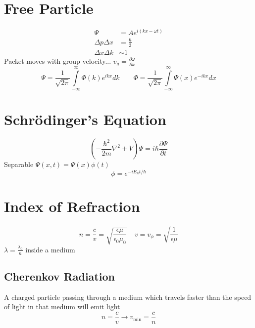 \documentclass[10pt,a4paper]{article}
\begin{document}
\section{Free Particle} %
\label{sec:free_particle}
\begin{align}
    \Psi &= Ae^{i(kx-\omega t)}\\
    \Delta p \Delta x &= \frac{\hbar}{2}\\
    \Delta  x \Delta k &\sim 1
\end{align}
Packet moves with group velocity... $v_g = \frac{\partial \omega}{\partial k}$
\begin{equation}
    \Psi = \frac{1}{\sqrt{2\pi}} \int \limits_{-\infty}^\infty \Phi(k)e^{ikx}dk~~~~~~~~~\Phi = \frac{1}{\sqrt{2\pi}} \int \limits_{-\infty}^{\infty} \Psi(x)e^{-ikx}dx
\end{equation}

\section{Schr\"odinger's Equation} %
\label{sec:schrodinger}
\begin{equation}
    \left( -\frac{\hbar^2}{2m}\nabla^2 + V \right) \Psi = i \hbar \frac{\partial \Psi}{\partial t}
\end{equation}
Separable $\Psi (x,t) = \Psi(x) \phi(t)$
\begin{equation}
    \phi = e^{-iE_nt/\hbar}
\end{equation}

\section{Index of Refraction} %
\label{sec:index_of_refraction}
\begin{equation}
    n = \frac{c}{v} = \sqrt{\frac{\epsilon \mu}{\epsilon_0 \mu_0}}~~~~~ v=v_\phi=\sqrt{\frac{1}{\epsilon \mu}}
\end{equation}
$\lambda = \frac{\lambda_0}{n}$ inside a medium

\subsection{Cherenkov Radiation} %
\label{sub:cherenkov_radiation}
A charged particle passing through a medium which travels faster than the speed of light in that medium will emit light
\begin{equation}
    n = \frac{c}{v} \longrightarrow v_{\textrm{min}} = \frac{c}{n}
\end{equation}
\end{document}
